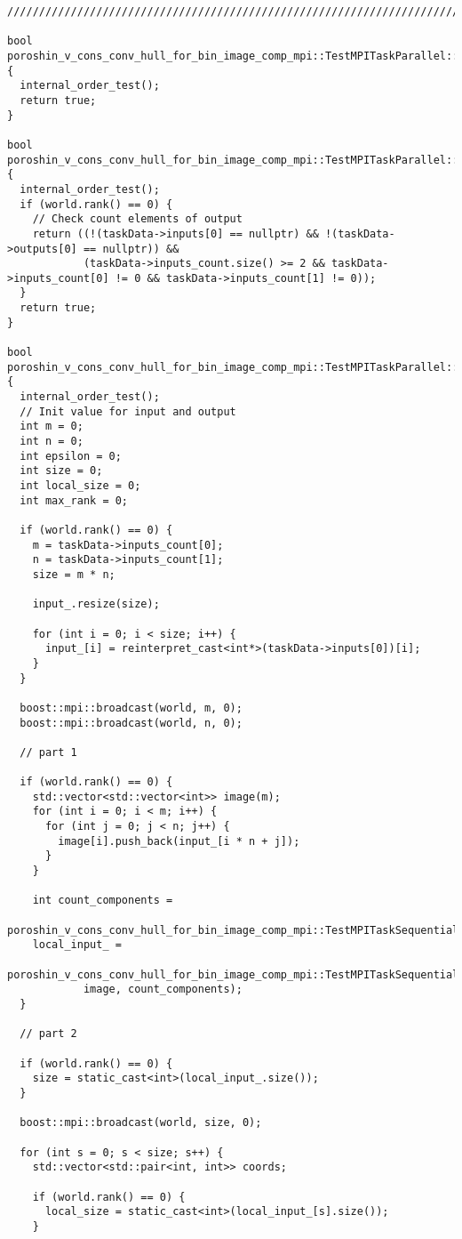 \documentclass[12pt]{article}
\begin{document}
\begin{verbatim}
/////////////////////////////////////////////////////////////////////////////////////////

bool poroshin_v_cons_conv_hull_for_bin_image_comp_mpi::TestMPITaskParallel::pre_processing() {
  internal_order_test();
  return true;
}

bool poroshin_v_cons_conv_hull_for_bin_image_comp_mpi::TestMPITaskParallel::validation() {
  internal_order_test();
  if (world.rank() == 0) {
    // Check count elements of output
    return ((!(taskData->inputs[0] == nullptr) && !(taskData->outputs[0] == nullptr)) &&
            (taskData->inputs_count.size() >= 2 && taskData->inputs_count[0] != 0 && taskData->inputs_count[1] != 0));
  }
  return true;
}

bool poroshin_v_cons_conv_hull_for_bin_image_comp_mpi::TestMPITaskParallel::run() {
  internal_order_test();
  // Init value for input and output
  int m = 0;
  int n = 0;
  int epsilon = 0;
  int size = 0;
  int local_size = 0;
  int max_rank = 0;

  if (world.rank() == 0) {
    m = taskData->inputs_count[0];
    n = taskData->inputs_count[1];
    size = m * n;

    input_.resize(size);

    for (int i = 0; i < size; i++) {
      input_[i] = reinterpret_cast<int*>(taskData->inputs[0])[i];
    }
  }

  boost::mpi::broadcast(world, m, 0);
  boost::mpi::broadcast(world, n, 0);

  // part 1

  if (world.rank() == 0) {
    std::vector<std::vector<int>> image(m);
    for (int i = 0; i < m; i++) {
      for (int j = 0; j < n; j++) {
        image[i].push_back(input_[i * n + j]);
      }
    }

    int count_components =
        poroshin_v_cons_conv_hull_for_bin_image_comp_mpi::TestMPITaskSequential::label_connected_components(image);
    local_input_ =
        poroshin_v_cons_conv_hull_for_bin_image_comp_mpi::TestMPITaskSequential::coordinates_connected_components(
            image, count_components);
  }

  // part 2

  if (world.rank() == 0) {
    size = static_cast<int>(local_input_.size());
  }

  boost::mpi::broadcast(world, size, 0);

  for (int s = 0; s < size; s++) {
    std::vector<std::pair<int, int>> coords;

    if (world.rank() == 0) {
      local_size = static_cast<int>(local_input_[s].size());
    }


\end{verbatim}
\end{document}
